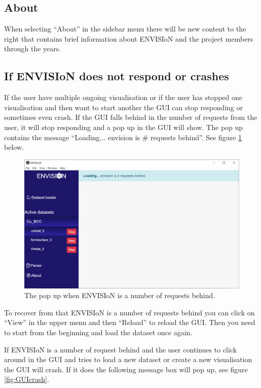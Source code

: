 \subsection{About}
When selecting ``About'' in the sidebar menu there will be new content to the right that contains brief information about ENVISIoN and the project members through the years.

\subsection{If ENVISIoN does not respond or crashes}
If the user have multiple ongoing visualisation or if the user has stopped one visualisation and then want to start another the GUI can stop responding or sometimes even crash. If the GUI falls behind in the number of requests from the user, it will stop responding and a pop up in the GUI will show. The pop up contains the message ``Loading... envision is # requests behind''. See figure \ref{fig:GUINotresponding} below. 

\begin{figure}[H]
    \centering
    \includegraphics[scale = 0.45]{images/EnvisionRequestsbehind.png}
    \caption{The pop up when ENVISIoN is a number of requests behind.}
    \label{fig:GUINotresponding}
\end{figure}

To recover from that ENVISIoN is a number of requests behind you can click on ``View'' in the upper menu and then ``Reload'' to reload the GUI. Then you need to start from the beginning and load the dataset once again.

If ENVISIoN is a number of request behind and the user continues to click around in the GUI and tries to load a new dataset or create a new visualisation the GUI will crash. If it does the following message box will pop up, see figure \ref{fig:GUIcrash}.


